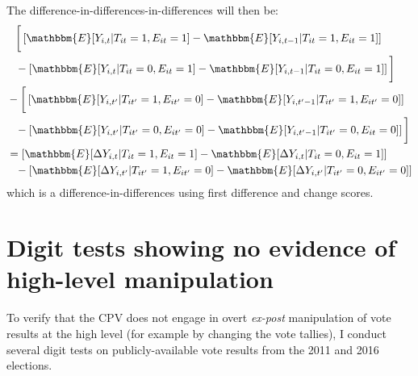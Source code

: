 \documentclass[12pt]{article}\usepackage[]{graphicx}\usepackage[]{color}
\newcommand{\1}{\mathbbm{1}}
\renewcommand\r{\right}
\renewcommand\l{\left}
\newcommand\E{\mathbbm{E}}
\begin{document}
The difference-in-differences-in-differences will then be:
	\begin{align*}
		&\phantom{=}\bigg[\l[\E[Y_{i,t} | T_{it}=1, E_{it}=1] - \E[Y_{i,t-1} | T_{it}=1, E_{it}=1]\r] \\
		&\phantom{=} - \l[\E[Y_{i,t} | T_{it}=0, E_{it}=1] - \E[Y_{i,t-1} | T_{it}=0, E_{it}=1]\r]\bigg] \\
		&- \bigg[\l[\E[Y_{i,t'} | T_{it'}=1, E_{it'}=0] - \E[Y_{i,t'-1} | T_{it'}=1, E_{it'}=0]\r] \\
		&\phantom{=} - \l[\E[Y_{i,t'} | T_{it'}=0, E_{it'}=0] - \E[Y_{i,t'-1} | T_{it'}=0, E_{it}=0]\r]\bigg] \\
		& = \l[\E[\Delta Y_{i,t} | T_{it}=1, E_{it}=1] - \E[\Delta Y_{i,t} | T_{it}=0, E_{it}=1]\r] \\
		&\phantom{=} - \l[\E[\Delta Y_{i,t'} | T_{it'}=1, E_{it'}=0] - \E[\Delta Y_{i,t'} | T_{it'}=0, E_{it'}=0]\r]
	\end{align*}	
which is a difference-in-differences using first difference and change scores.

\newpage
\section{Digit tests showing no evidence of high-level manipulation}
To verify that the CPV does not engage in overt \textit{ex-post} manipulation of vote results at the high level (for example by changing the vote tallies), I conduct several digit tests on publicly-available vote results from the 2011 and 2016 elections. 
\end{document}
